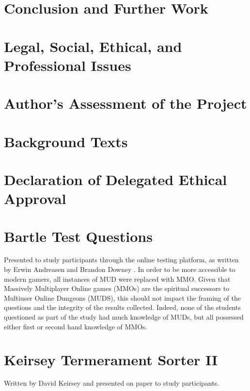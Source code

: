 \documentclass[12pt,a4paper,twoside]{report}
\begin{document}
\chapter{Conclusion and Further Work}

\chapter{Legal, Social, Ethical, and Professional Issues}
\label{sec:issues}

\chapter{Author's Assessment of the Project}

\chapter{Background Texts}
\begin{appendices}
	
\chapter{Declaration of Delegated Ethical Approval}
\label{sec:bsrec}

	
\chapter{Bartle Test Questions}
\label{sec:bartle}
Presented to study participants through the online testing platform, as written by Erwin Andreasen and Brandon Downey \cite{bartle-questions}. In order to be more accessible to modern gamers, all instances of MUD were replaced with MMO. Given that Massively Multiplayer Online games (MMOs) are the spiritual successors to Multiuser Online Dungeons (MUDS), this should not impact the framing of the questions and the integrity of the results collected. Indeed, none of the students questioned as part of the study had much knowledge of MUDs, but all possessed either first or second hand knowledge of MMOs.
\linespread{1.0}

\linespread{1.3}

\chapter{Keirsey Termerament Sorter II}
\label{sec:keirsey}
Written by David Keirsey \cite{keirsey1998please} and presented on paper to study participants.

\end{appendices}



\end{document}
